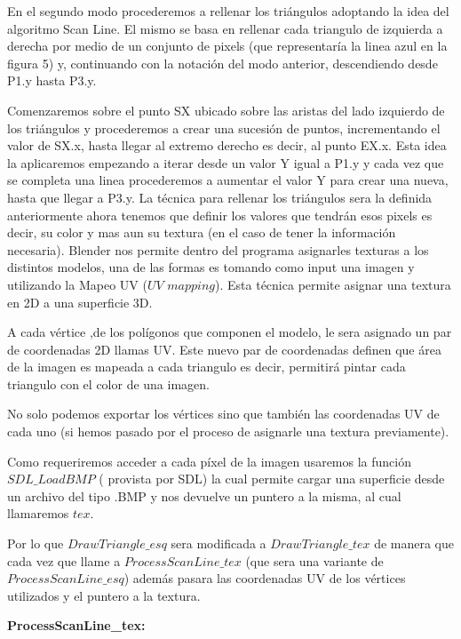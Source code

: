 \documentclass[a4paper]{article}
\newcounter{col}
\begin{document}
\par En el segundo modo procederemos a rellenar los triángulos adoptando la idea del algoritmo Scan Line. El mismo se basa en rellenar cada triangulo de izquierda a derecha por medio de un conjunto de pixels (que representaría la linea azul en la figura 5) y, continuando con la notación del modo anterior, descendiendo desde P1.y hasta P3.y.  
\par Comenzaremos sobre el punto SX ubicado sobre las aristas del lado izquierdo de los triángulos y procederemos a crear una sucesión de puntos, incrementando el valor de SX.x, hasta llegar al extremo derecho es decir, al punto EX.x. Esta idea la aplicaremos empezando a iterar desde un valor Y igual a P1.y y cada vez que se completa una linea procederemos a aumentar el valor Y para crear una nueva, hasta que llegar a P3.y. 
La técnica para rellenar los triángulos sera la definida anteriormente ahora tenemos que definir los valores que tendrán esos pixels es decir, su color y mas aun su textura (en el caso de tener la información necesaria).
Blender nos permite dentro del programa asignarles texturas a los distintos modelos, una de las formas es tomando como input una imagen y utilizando la Mapeo UV ($UV$ $mapping$). Esta técnica permite asignar una textura en 2D a una superficie 3D. 
\par A cada vértice ,de los polígonos que componen el modelo, le sera asignado un par de coordenadas 2D llamas UV. Este nuevo par de coordenadas definen que área de la imagen es mapeada a cada triangulo es decir, permitirá pintar cada triangulo con el color de una imagen. 
\par No solo podemos exportar los vértices sino que también las coordenadas UV de cada uno (si hemos pasado por el proceso de asignarle una textura previamente).
\par Como requeriremos acceder a cada píxel de la imagen usaremos la función $SDL\_LoadBMP$ ( provista por SDL) la cual permite cargar una superficie desde un archivo del tipo .BMP y nos devuelve un puntero a la misma, al cual llamaremos $tex$.    
 
\par Por lo que $DrawTriangle\_esq$ sera modificada a $DrawTriangle\_tex$ de manera que cada vez que llame a $ProcessScanLine\_tex$ (que sera una variante de $ProcessScanLine\_esq$) además pasara las coordenadas UV de los vértices utilizados y el puntero a la textura.
 
\textbf{ProcessScanLine\_tex:} 
\end{document}
